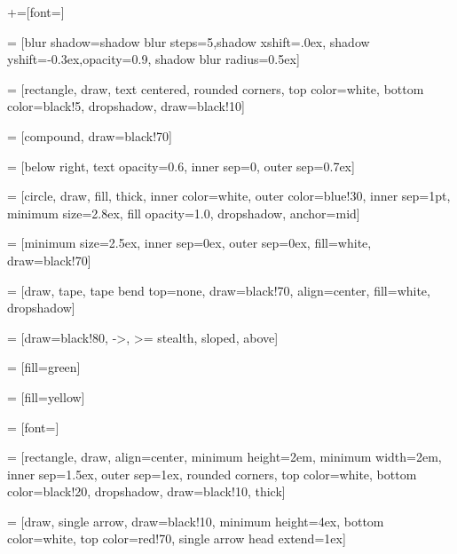 
+=[font=\footnotesize]

 = [blur shadow={shadow blur steps=5,shadow xshift=.0ex,
                                       shadow yshift=-0.3ex,opacity=0.9,
                                       shadow blur radius=0.5ex}]

 = [rectangle, draw, text centered,
                         rounded corners,
                         top color=white,
                         bottom color=black!5,
                         dropshadow,
                         draw=black!10]

 = [compound, draw=black!70]

 = [below right,
                             text opacity=0.6, inner sep=0, outer sep=0.7ex]

 = [circle, draw, fill, thick,
                          inner color=white,
                          outer color=blue!30,
                          inner sep=1pt,
                          minimum size=2.8ex,
                          fill opacity=1.0, dropshadow,
                          anchor=mid]

 = [minimum size=2.5ex, inner sep=0ex, outer sep=0ex,
                       fill=white, draw=black!70]

 = [draw, tape, tape bend top=none,
                         draw=black!70, align=center, fill=white, dropshadow]

 = [draw=black!80, ->, >= stealth, sloped, above]

 = [fill=green]

 = [fill=yellow]

 = [font=\normalsize]

 = [rectangle, draw, align=center,
                            minimum height=2em, minimum width=2em,
                            inner sep=1.5ex, outer sep=1ex,
                            rounded corners,
                            top color=white,
                            bottom color=black!20,
                            dropshadow,
                            draw=black!10, thick]

 = [draw, single arrow, draw=black!10, minimum height=4ex,
                         bottom color=white, top color=red!70,
                         single arrow head extend=1ex]

